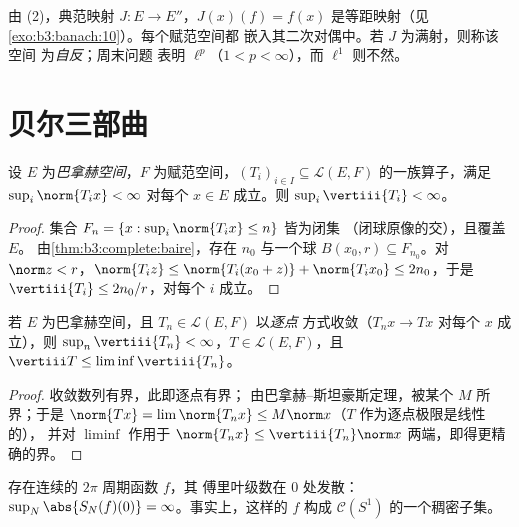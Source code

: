 \begin{remark}\label{rem:b3:banach:bidual}
由 (2)，典范映射 $J \colon E \to E''$，$J(x)(f) =
f(x)$ 是等距映射（见\cref{exo:b3:banach:10}）。每个赋范空间都
嵌入其二次对偶中。若 $J$ 为满射，则称该空间
为\emph{自反}；周末问题
表明 $\ell^p$（$1 < p < \infty$），而
$\ell^1$ 则不然。
\end{remark}

\section{贝尔三部曲}

\begin{theorem}
\label{thm:b3:banach:banachsteinhaus}
设 $E$ 为\emph{巴拿赫空间}，$F$ 为赋范空间，$(T_i)_{i\in
I} \subseteq \mathcal L(E, F)$ 的一族算子，满足 $\sup_i
\norm{T_ix} < \infty$ 对每个 $x \in E$ 成立。则 $\sup_i
\vertiii{T_i} < \infty$。
\end{theorem}

\begin{proof}
集合 $F_n = \{x : \sup_i\norm{T_ix} \leq n\}$ 皆为闭集
（闭球原像的交），且覆盖 $E$。
由\cref{thm:b3:complete:baire}，存在 $n_0$ 与一个球
$B(x_0, r) \subseteq F_{n_0}$。对 $\norm z < r$，$\norm{T_iz}
\leq \norm{T_i(x_0 + z)} + \norm{T_ix_0} \leq 2n_0$，于是
$\vertiii{T_i} \leq 2n_0/r$，对每个 $i$ 成立。
\end{proof}

\begin{corollary}\label{cor:b3:banach:bslimits}
若 $E$ 为巴拿赫空间，且 $T_n \in \mathcal L(E,F)$ 以\emph{逐点}
方式收敛（$T_nx \to Tx$ 对每个 $x$ 成立），则 $\sup_n
\vertiii{T_n} < \infty$，$T \in \mathcal L(E, F)$，且
$\vertiii T \leq \liminf \vertiii{T_n}$。
\end{corollary}

\begin{proof}
收敛数列有界，此即逐点有界；
由巴拿赫--斯坦豪斯定理，被某个 $M$ 所界；于是 $\norm{Tx}
= \lim\norm{T_nx} \leq M\norm x$（$T$ 作为逐点极限是线性的），
并对 $\liminf$ 作用于
$\norm{T_nx} \leq \vertiii{T_n}\norm x$ 两端，即得更精确的界。
\end{proof}

\begin{theorem}[发散的傅里叶级数]
\label{thm:b3:banach:fourierdiverge}
存在连续的 $2\pi$ 周期函数 $f$，其
傅里叶级数在 $0$ 处发散：$\sup_N\abs{S_N(f)(0)} =
\infty$。事实上，这样的 $f$ 构成 $\mathcal
C(S^1)$ 的一个稠密子集。
\end{theorem}

